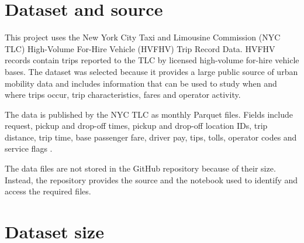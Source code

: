 \documentclass[10pt,twocolumn]{article}
\begin{document}

\section{Dataset and source}

This project uses the New York City Taxi and Limousine Commission
(NYC TLC) High-Volume For-Hire Vehicle (HVFHV) Trip Record Data.
HVFHV records contain trips reported to the TLC by licensed
high-volume for-hire vehicle bases. The dataset was selected because
it provides a large public source of urban mobility data and includes
information that can be used to study when and where trips occur,
trip characteristics, fares and operator activity.

The data is published by the NYC TLC as monthly Parquet files.
Fields include request, pickup and drop-off times, pickup and
drop-off location IDs, trip distance, trip time, base passenger
fare, driver pay, tips, tolls, operator codes and service flags
\cite{tlc,dict}.

The data files are not stored in the GitHub repository because of
their size. Instead, the repository provides the source and the
notebook used to identify and access the required files.

\section{Dataset size}
\end{document}
